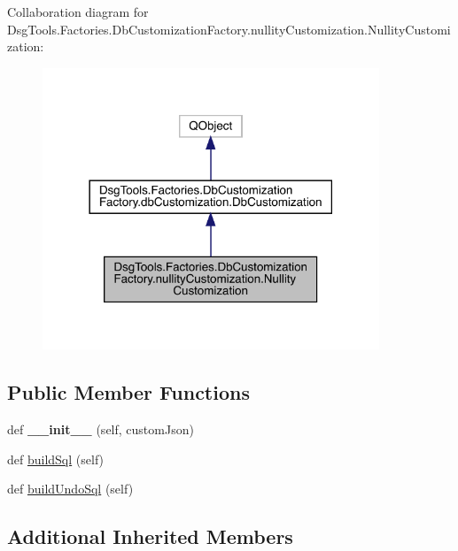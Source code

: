 Collaboration diagram for Dsg\+Tools.\+Factories.\+Db\+Customization\+Factory.\+nullity\+Customization.\+Nullity\+Customization\+:
\nopagebreak
\begin{figure}[H]
\begin{center}
\leavevmode
\includegraphics[width=285pt]{class_dsg_tools_1_1_factories_1_1_db_customization_factory_1_1nullity_customization_1_1_nullity_customization__coll__graph}
\end{center}
\end{figure}
\subsection*{Public Member Functions}
\begin{DoxyCompactItemize}
\item 
\mbox{\label{class_dsg_tools_1_1_factories_1_1_db_customization_factory_1_1nullity_customization_1_1_nullity_customization_ac4485eb6d9411a3486297e016d3687f8}} 
def {\bfseries \+\_\+\+\_\+init\+\_\+\+\_\+} (self, custom\+Json)
\item 
def \mbox{\hyperlink{class_dsg_tools_1_1_factories_1_1_db_customization_factory_1_1nullity_customization_1_1_nullity_customization_a268361ed336ab08a7d3a1d303064538d}{build\+Sql}} (self)
\item 
def \mbox{\hyperlink{class_dsg_tools_1_1_factories_1_1_db_customization_factory_1_1nullity_customization_1_1_nullity_customization_aafee226914932c96c906606a87553627}{build\+Undo\+Sql}} (self)
\end{DoxyCompactItemize}
\subsection*{Additional Inherited Members}


